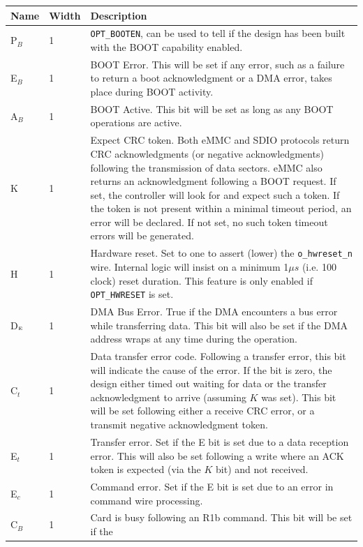 \documentclass{gqtekspec}
\begin{document}
\begin{table}\begin{center}
\begin{tabular}{|p{1.2in}|p{0.5in}|p{3.5in}|}\hline
	\rowcolor[gray]{0.85} Name & Width & Description\\\hline\hline
P$_B$ &1& {\tt OPT\_BOOTEN}, can be used to tell if the design has been
	built with the BOOT capability enabled.  \\
E$_B$ &1& BOOT Error.  This will be set if any error, such as a failure to
	return a boot acknowledgment or a DMA error, takes place during BOOT
	activity.  \\
A$_B$ &1& BOOT Active.  This bit will be set as long as any BOOT operations
	are active.  \\
K &1& Expect CRC token.  Both eMMC and SDIO protocols return CRC
	acknowledgments (or negative acknowledgments) following the
	transmission of data sectors.  eMMC also returns an acknowledgment
	following a BOOT request.  If set, the controller will look for
	and expect such a token.  If the token is not present within a minimal
	timeout period, an error will be declared.  If not set, no such token
	timeout errors will be generated.  \\
H &1& Hardware reset.  Set to one to assert (lower) the {\tt o\_hwreset\_n}
	wire.  Internal logic will insist on a minimum 1$\mu s$
	(i.e. 100 clock) reset duration.  This feature is only enabled if
	{\tt OPT\_HWRESET} is set.\\
D$_{\mbox{\tiny E}}$&1& DMA Bus Error.  True if the DMA encounters a bus error
	while transferring data.  This bit will also be set if the DMA address
	wraps at any time during the operation. \\
C$_t$&1& Data transfer error code.  Following a transfer error, this bit
	will indicate the cause of the error.  If the bit is zero, the design
	either timed out waiting for data or the transfer acknowledgment to
	arrive (assuming $K$ was set).  This bit will be set following either
	a receive CRC error, or a transmit negative acknowledgment token. \\
E$_t$&1& Transfer error.  Set if the E bit is set due to a data reception error.
	This will also be set following a write where an ACK token is expected
	(via the $K$ bit) and not received.
	\\
E$_c$&1& Command error.  Set if the E bit is set due to an error in command
	wire processing.  \\
C$_B$&1& Card is busy following an R1b command.  This bit will be set if the

\end{tabular}
\end{center}
\end{table}
\end{document}
